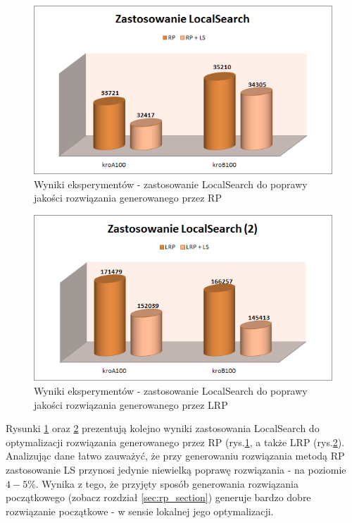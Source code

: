 \documentclass{article}
\begin{document}
\begin{figure}[h!]
\centering\includegraphics[width=13cm]{img/wyk2.png}
\caption{Wyniki eksperymentów - zastosowanie LocalSearch do poprawy jakości rozwiązania generowanego przez RP}
\label{wyk:wyniki_ls_rp}
\end{figure}

\begin{figure}[h!]
\centering\includegraphics[width=13cm]{img/wyk3.png}
\caption{Wyniki eksperymentów - zastosowanie LocalSearch do poprawy jakości rozwiązania generowanego przez LRP}
\label{wyk:wyniki_ls_lrp}
\end{figure}

Rysunki \ref{wyk:wyniki_ls_rp} oraz \ref{wyk:wyniki_ls_lrp} prezentują kolejno wyniki zastosowania LocalSearch do optymalizacji rozwiązania generowanego przez RP (rys.\ref{wyk:wyniki_ls_rp}, a także LRP (rys.\ref{wyk:wyniki_ls_lrp}). Analizując dane łatwo zauważyć, że przy generowaniu rozwiązania metodą RP zastosowanie LS przynosi jedynie niewielką poprawę rozwiązania - na poziomie $4-5\%$. Wynika z tego, że przyjęty sposób generowania rozwiązania początkowego (zobacz rozdział \ref{sec:rp_section}) generuje bardzo dobre rozwiązanie początkowe - w sensie lokalnej jego optymalizacji.
\end{document}
